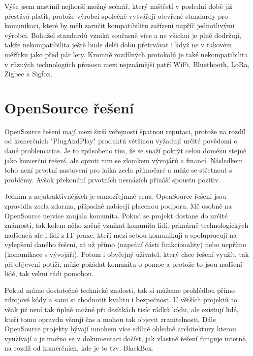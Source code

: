 \documentclass[thesis=B,czech]{FITthesis}[2019/12/23]
\begin{document}
Výše jsem nastínil nejhorší možný scénář, který naštěstí v poslední době již přestává platit, protože výrobci společně vytvářejí otevřené standardy pro komunikaci, které by měli zaručit kompatibilitu zařízení napříč jednotlivými výrobci. Bohužel standardů vzniká současně více a ne všichni je plně dodržují, takže nekompatibilita ještě bude delší dobu přetrvávat i když ne v takovém měřítku jako před pár lety. Kromně rozdílných protokolů je také nekompatibilita v různých technologiích přenosu mezi nejznámější patří WiFi, Bluethooth, LoRa, Zigbee a Sigfox. 

\section{OpenSource řešení}
OpenSource řešení mají mezi širší veřejností špatnou reputaci, protože na rozdíl od komerčních "PlugAndPlay" produktů většinou vyžadují určité povědomí o dané problematice. Je to způsobeno tím, že se snaží pokrýt celou doménu stejně jako komerční řešení, ale oproti nim se zlomkem vývojářů a financí. Následkem toho není prvotní nastavení pro laika zcela přímočaré a může se střetnout s problémy. Avšak překonání prvotních nesnázích přináší spoustu pozitiv. 

Jedním z nejatraktivnějších je samozřejmně cena. OpenSource řešení jsou zpravidla zcela zdarma, případně nabícejí placenou podporu. Mě osobně na OpenSource nejvíce zaujala komunita. Pokud se projekt dostane do určité známosti, tak kolem něho začně vznikat komunita lidí, primárně technologických nadšenců ale i lidí z IT praxe, kteří mezi sebou komunikují a spolupracují na vylepšení daného řešení, ať už přímo (napsání části funkcionality) nebo nepřímo (komunikace s vývojáři). Potom i obyčejný uživatel, který chce řešení využít, tak při objevení potíží, může požádat komunitu o pomoc a protože to jsou nadšení lidé, tak velmi rádi pomohou. 

Pokud máme dostatečné technické znalosti, tak si můžeme prohlédlou přímo zdrojové kódy a sami si zhodnotit kvalitu i bezpečnost. U větších projektů to však již není tak úplně možné při desítkách tisíc rádků kódu, ale existují lidé, kteří tomu opravdu věnují čas a mohou tak objevit zranitelnosti. Dále OpenSource projekty bývají mnohem více sdílné ohledně architektury kterou využívají a je možno se v dokumentaci dočíst, jak vlastně řešení funguje interně, na rozdíl od komerčních, kde je to tzv. BlackBox.
\end{document}
